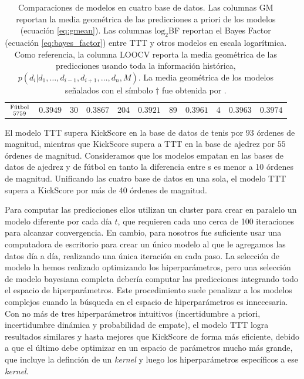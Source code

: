 \documentclass[a4paper,11pt]{book}
\newcommand\hfrac[2]{\genfrac{}{}{0pt}{}{#1}{#2}} %
\theoremstyle{definition}
\newif\ifen
\newcommand{\en}[1]{\ifen#1\fi}
\begin{document}
\begin{table}[ht!]
\begin{tabular}{c|cc|cc|cc|cc|c||c}
 \multirow{2}{*}{$\hfrac{\text{\scriptsize \en{Football}Fútbol}}{\num{5759}}$} & \multirow{2}{*}{$0.3949$} & \multirow{2}{*}{\num{30}} & \multirow{2}{*}{$0.3867$} & \multirow{2}{*}{\num{204}} & \multirow{2}{*}{$0.3921$} & \multirow{2}{*}{\num{89}} & \multirow{2}{*}{$\bm{0.3961}$} & \multirow{2}{*}{\num{4}} & \multirow{2}{*}{$\bm{0.3963}$} &  \multirow{2}{*}{${0.3974}$} \\
  & & & & & & & & & & \\ \hline
  \end{tabular}
  \caption{
  Comparaciones de modelos en cuatro base de datos.
  Las columnas GM reportan la media geométrica de las predicciones a priori de los modelos (ecuación \ref{eq:gmean}).
  Las columnas $\text{log}_2$BF reportan el Bayes Factor (ecuación \ref{eq:bayes_factor}) entre TTT y otros modelos en escala logarítmica.
  Como referencia, la columna LOOCV reporta la media geométrica de las predicciones usando toda la información histórica, $p(d_i| d_1, \dots, d_{i-1}, d_{i+1}, \dots, d_n , M)$.
  La media geométrica de los modelos señalados con el símbolo $\dagger$ fue obtenida por \cite{Maystre2019}.
  }
  \label{Tab:Models}
\end{table}
%
El modelo TTT supera KickScore en la base de datos de tenis por $93$ órdenes de magnitud, mientras que KickScore supera a TTT en la base de ajedrez por $55$ órdenes de magnitud.
%
Consideramos que los modelos empatan en las bases de datos de ajedrez y de fútbol en tanto la diferencia entre s es menor a 10 órdenes de magnitud.
%
Unificando las cuatro base de datos en una sola, el modelo TTT supera a KickScore por más de 40 órdenes de magnitud.

Para computar las predicciones ellos utilizan un cluster para crear en paralelo un modelo diferente por cada día $t$, que requieren cada uno cerca de 100 iteraciones para alcanzar convergencia.
%
En cambio, para nosotros fue suficiente usar una computadora de escritorio para crear un único modelo al que le agregamos las datos día a día, realizando una única iteración en cada paso.
%
La selección de modelo la hemos realizado optimizando los hiperparámetros, pero una selección de modelo bayesiana completa debería computar las predicciones integrando todo el espacio de hiperparámetros.
%
Este procedimiento suele penalizar a los modelos complejos cuando la búsqueda en el espacio de hiperparámetros es innecesaria.
%
Con no más de tres hiperparámetros intuitivos (incertidumbre a priori, incertidumbre dinámica y probabilidad de empate), el modelo TTT logra resultados similares y hasta mejores que KickScore de forma más eficiente, debido a que el último debe optimizar en un espacio de parámetros mucho más grande, que incluye la definción de un \emph{kernel} y luego los hiperparámetros específicos a ese \emph{kernel}.
\end{document}
